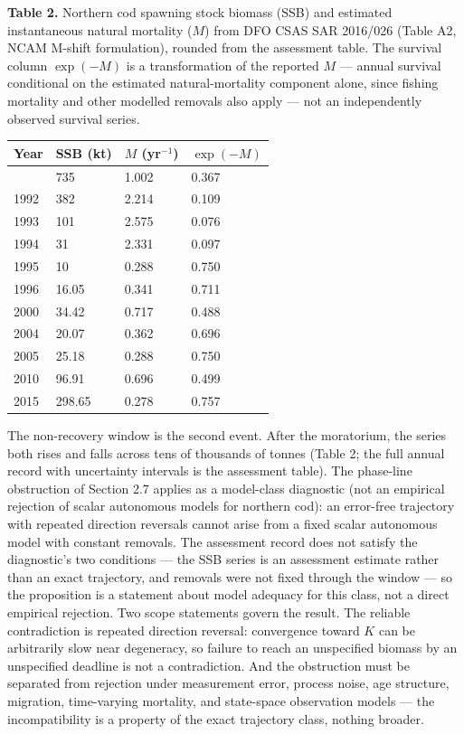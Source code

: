 \documentclass[11pt]{article}
\begin{document}
\textbf{Table 2.} Northern cod spawning stock biomass (SSB) and
estimated instantaneous natural mortality (\(M\)) from DFO CSAS SAR
2016/026 (Table A2, NCAM M-shift formulation), rounded from the
assessment table. The survival column \(\exp(-M)\) is a transformation
of the reported \(M\) --- annual survival conditional on the estimated
natural-mortality component alone, since fishing mortality and other
modelled removals also apply --- not an independently observed survival
series.

\begin{longtable}[]{@{}llll@{}}
\toprule\noalign{}
Year & SSB (kt) & \(M\) (yr\(^{-1}\)) & \(\exp(-M)\) \\
\midrule\noalign{}
\endhead
\bottomrule\noalign{}
\endlastfoot
1991 & 735 & 1.002 & 0.367 \\
1992 & 382 & 2.214 & 0.109 \\
1993 & 101 & 2.575 & 0.076 \\
1994 & 31 & 2.331 & 0.097 \\
1995 & 10 & 0.288 & 0.750 \\
1996 & 16.05 & 0.341 & 0.711 \\
2000 & 34.42 & 0.717 & 0.488 \\
2004 & 20.07 & 0.362 & 0.696 \\
2005 & 25.18 & 0.288 & 0.750 \\
2010 & 96.91 & 0.696 & 0.499 \\
2015 & 298.65 & 0.278 & 0.757 \\
\end{longtable}

The non-recovery window is the second event. After the moratorium, the series both rises and falls across tens of thousands of tonnes (Table 2; the full annual record with uncertainty intervals is the assessment table). The phase-line obstruction of Section 2.7 applies as
a model-class diagnostic (not an empirical rejection of scalar autonomous models for northern cod): an error-free trajectory with repeated
direction reversals cannot arise from a fixed scalar autonomous model
with constant removals. The assessment record does not satisfy the
diagnostic's two conditions --- the SSB series is an assessment estimate
rather than an exact trajectory, and removals were not fixed through the
window --- so the proposition is a statement about model adequacy for
this class, not a direct empirical rejection. Two scope statements
govern the result. The reliable contradiction is repeated direction
reversal: convergence toward \(K\) can be arbitrarily slow near
degeneracy, so failure to reach an unspecified biomass by an unspecified
deadline is not a contradiction. And the obstruction must be separated
from rejection under measurement error, process noise, age structure,
migration, time-varying mortality, and state-space observation models
--- the incompatibility is a property of the exact trajectory class,
nothing broader.
\end{document}
